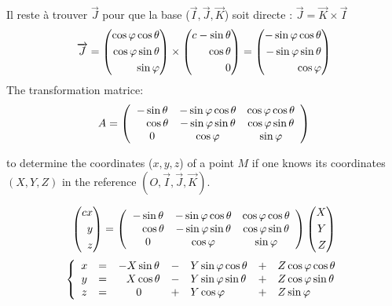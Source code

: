 Il reste à trouver $\overrightarrow{J}$ pour que la base
($\overrightarrow{I},\overrightarrow{J},\overrightarrow{K}$) soit directe :
$\overrightarrow{J}=\overrightarrow{K}\times\overrightarrow{I}$
\[
\overrightarrow{J}=\left(\begin{aligned}
 \cos\varphi\cos\theta\\
 \cos\varphi\sin\theta\\
 \sin\varphi
 \end{aligned}
 \right)
\times
\left(
 \begin{aligned}{c}
 -\sin\theta\\
 \hphantom{-}\cos\theta\\
 0
 \end{aligned}
 \right)
 =
 \left(\begin{aligned}
 -\sin\varphi\cos\theta\\
 -\sin\varphi\sin\theta\\
 \cos\varphi
 \end{aligned}
 \right)
 \]
 The transformation matrice:
\[
A=\left(%
 \begin{array}{ccc}
 -\sin\theta&-\sin\varphi\cos\theta&\cos\varphi\cos\theta\\
 \hphantom{-}\cos\theta&-\sin\varphi\sin\theta&\cos\varphi\sin\theta\\
 0&\cos\varphi&\sin\varphi
 \end{array}
 \right)
 \]

to determine the coordinates ($ x, y, z $) of a point $M$ if one knows its
  coordinates $(X, Y, Z)$ in the reference
 $(O,\overrightarrow{I},\overrightarrow{J},\overrightarrow{K})$.

 \[
 \left(\begin{aligned}{c}
 x\\
 y\\
 z
 \end{aligned}
 \right)
 =\left(%
 \begin{array}{ccc}
 -\sin\theta&-\sin\varphi\cos\theta&\cos\varphi\cos\theta\\
 \hphantom{-}\cos\theta&-\sin\varphi\sin\theta&\cos\varphi\sin\theta\\
 0&\cos\varphi&\sin\varphi
 \end{array}
 \right)
\left(\begin{aligned}
 X\\
 Y\\
 Z
 \end{aligned}
 \right)
\]
\[
\left\lbrace\begin{array}{cccclcl}
x&=&-X\sin\theta&-&Y\sin\varphi\cos\theta&+&Z\cos\varphi\cos\theta\\
y&=&\hphantom{-}X\cos\theta&-&Y\sin\varphi\sin\theta&+&Z\cos\varphi\sin\theta\\
z&=&0&+&Y\cos\varphi&+&Z\sin\varphi
\end{array}
\right.
\]

